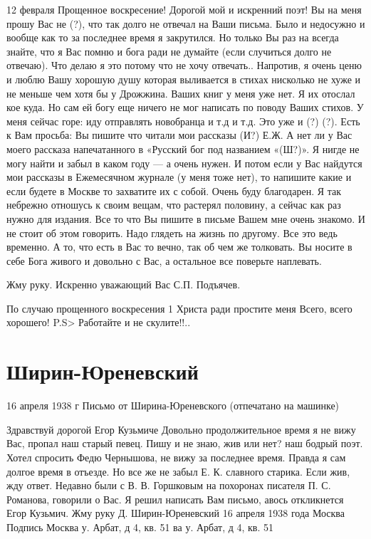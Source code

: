 \documentclass[]{memoir}
\begin{document}
12 февраля
Прощенное воскресение!
Дорогой мой и искренний поэт!
Вы на меня прошу Вас не (?),  что так долго не отвечал на Ваши письма. Было  и недосужно и вообще как то за последнее время я закрутился. Но только Вы раз на всегда знайте, что я Вас помню и бога ради не думайте (если случиться долго не отвечаю). Что делаю я это потому что не хочу отвечать.. Напротив, я очень ценю и люблю Вашу хорошую душу которая выливается в стихах нисколько не хуже и не меньше чем хотя бы у Дрожжина.
Ваших книг у меня уже нет. Я их отослал кое куда. Но сам ей богу еще ничего не мог написать по поводу Ваших стихов. У меня сейчас горе: иду отправлять новобранца и т.д и т.д. Это уже и (?) (?).
Есть к Вам просьба: Вы пишите что читали мои рассказы (И?) Е.Ж.  А нет ли у Вас моего рассказа напечатанного в «Русский бог под названием «(Ш?)». Я нигде не могу найти и забыл в каком году — а очень нужен. И потом если у Вас найдутся  мои рассказы в Ежемесячном журнале (у меня тоже нет), то напишите какие и если будете в Москве то захватите их с собой. Очень буду благодарен. Я так небрежно отношусь к своим вещам, что растерял половину, а сейчас как раз нужно для издания.
Все то что Вы пишите в письме Вашем мне очень знакомо. И не стоит об этом говорить. Надо глядеть на жизнь по другому. Все это ведь временно. А то, что есть в Вас то вечно, так об чем же толковать. Вы носите в себе Бога живого и довольно с Вас, а остальное все поверьте наплевать.

Жму руку.
Искренно уважающий Вас С.П. Подъячев.

По случаю прощенного воскресения 
1 Христа ради простите меня
Всего, всего хорошего!
P.S> Работайте и не скулите!!..

\section{Ширин-Юреневский}
16 апреля 1938 г 
Письмо  от Ширина-Юреневского (отпечатано на машинке)

Здравствуй дорогой Егор Кузьмиче
Довольно продолжительное время я не вижу Вас, пропал наш старый певец. Пишу и не знаю, жив или нет? наш бодрый поэт. Хотел спросить Федю Чернышова, не вижу за последнее время.  Правда я сам долгое время в отъезде. Но все же не забыл Е. К. славного старика.
Если жив, жду ответ. Недавно были с В. В. Горшковым на похоронах писателя П. С. Романова, говорили о Вас.
Я решил написать Вам письмо, авось откликнется Егор Кузьмич.
Жму руку Д. Ширин-Юреневский
16 апреля 1938 года
Москва
Подпись
Москва у. Арбат, д 4, кв. 51
ва у. Арбат, д 4, кв. 51
\end{document}
